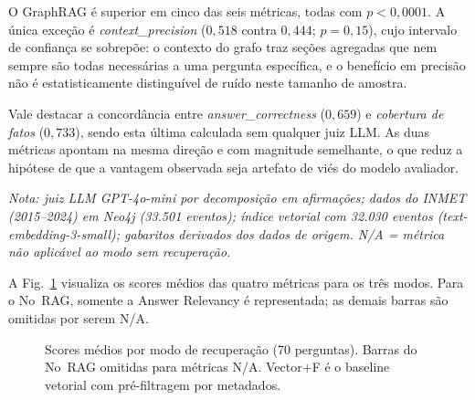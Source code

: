 \documentclass[conference]{IEEEtran}
\begin{document}
O GraphRAG é superior em cinco das seis métricas, todas com
$p<0{,}0001$. A única exceção é \textit{context\_precision}
($0{,}518$ contra $0{,}444$; $p=0{,}15$), cujo intervalo de confiança
se sobrepõe: o contexto do grafo traz seções agregadas que nem sempre
são todas necessárias a uma pergunta específica, e o benefício em
precisão não é estatisticamente distinguível de ruído neste tamanho de
amostra.

Vale destacar a concordância entre \textit{answer\_correctness}
($0{,}659$) e \textit{cobertura de fatos} ($0{,}733$), sendo esta
última calculada sem qualquer juiz LLM. As duas métricas apontam na
mesma direção e com magnitude semelhante, o que reduz a hipótese de
que a vantagem observada seja artefato de viés do modelo avaliador.

\textit{Nota: juiz LLM GPT-4o-mini por decomposição em afirmações;
dados do INMET (2015--2024) em Neo4j (33.501 eventos); índice vetorial
com 32.030 eventos (text-embedding-3-small); gabaritos derivados dos
dados de origem. N/A = métrica não aplicável ao modo sem recuperação.}

A Fig.~\ref{fig:barras} visualiza os scores médios das quatro
métricas para os três modos.
Para o No~RAG, somente a Answer Relevancy é representada; as
demais barras são omitidas por serem N/A.

\begin{figure}[htbp]
\caption{Scores médios por modo de recuperação (70 perguntas).
  Barras do No~RAG omitidas para métricas N/A. Vector$+$F é o baseline
  vetorial com pré-filtragem por metadados.}
\label{fig:barras}
\end{figure}
\end{document}
